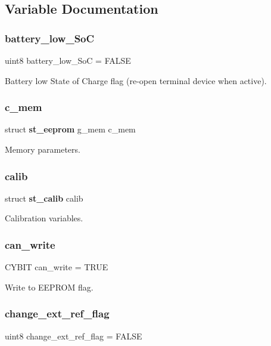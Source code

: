 \subsection{Variable Documentation}
\mbox{\label{globals_8c_ab4765549a3f6990d35f3d0740263b254}} 
\subsubsection{battery\+\_\+low\+\_\+\+SoC}
{\footnotesize\ttfamily uint8 battery\+\_\+low\+\_\+\+SoC = F\+A\+L\+SE}

Battery low State of Charge flag (re-\/open terminal device when active). \mbox{\label{globals_8c_a3ad3057028e3ab399e1d1549a8d67ab9}} 
\subsubsection{c\+\_\+mem}
{\footnotesize\ttfamily struct \textbf{ st\+\_\+eeprom} g\+\_\+mem c\+\_\+mem}

Memory parameters. \mbox{\label{globals_8c_aed96fdd8308fe2c4fc07c3b5db1c7bbb}} 
\subsubsection{calib}
{\footnotesize\ttfamily struct \textbf{ st\+\_\+calib} calib}

Calibration variables. \mbox{\label{globals_8c_acd57396ca1b2a02a76877acecd29ddb0}} 
\subsubsection{can\+\_\+write}
{\footnotesize\ttfamily C\+Y\+B\+IT can\+\_\+write = T\+R\+UE}

Write to E\+E\+P\+R\+OM flag. \mbox{\label{globals_8c_a55787e40db60be586171023875f15130}} 
\subsubsection{change\+\_\+ext\+\_\+ref\+\_\+flag}
{\footnotesize\ttfamily uint8 change\+\_\+ext\+\_\+ref\+\_\+flag = F\+A\+L\+SE}

